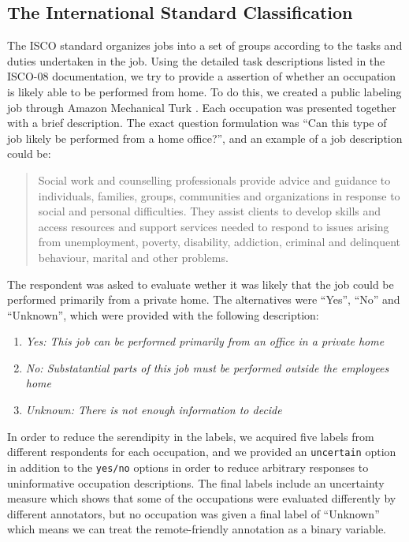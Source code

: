 \documentclass[11pt,]{article}
\begin{document}
\hypertarget{the-international-standard-classification}{%
\subsection{The International Standard
Classification}\label{the-international-standard-classification}}

The ISCO standard organizes jobs into a set of groups according to the
tasks and duties undertaken in the job. Using the detailed task
descriptions listed in the ISCO-08 documentation, we try to provide a
assertion of whether an occupation is likely able to be performed from
home. To do this, we created a public labeling job through Amazon
Mechanical Turk \citep{Turk2020}. Each occupation was presented together
with a brief description. The exact question formulation was ``Can this
type of job likely be performed from a home office?'', and an example of
a job description could be:

\begin{quote}
Social work and counselling professionals provide advice and guidance to
individuals, families, groups, communities and organizations in response
to social and personal difficulties. They assist clients to develop
skills and access resources and support services needed to respond to
issues arising from unemployment, poverty, disability, addiction,
criminal and delinquent behaviour, marital and other problems.
\end{quote}

The respondent was asked to evaluate wether it was likely that the job
could be performed primarily from a private home. The alternatives were
``Yes'', ``No'' and ``Unknown'', which were provided with the following
description:

\begin{enumerate}
\def\labelenumi{\arabic{enumi}.}
\item
  \emph{Yes: This job can be performed primarily from an office in a
  private home}
\item
  \emph{No: Substatantial parts of this job must be performed outside
  the employees home}
\item
  \emph{Unknown: There is not enough information to decide}
\end{enumerate}

In order to reduce the serendipity in the labels, we acquired five
labels from different respondents for each occupation, and we provided
an \texttt{uncertain} option in addition to the \texttt{yes/no} options
in order to reduce arbitrary responses to uninformative occupation
descriptions. The final labels include an uncertainty measure which
shows that some of the occupations were evaluated differently by
different annotators, but no occupation was given a final label of
``Unknown'' which means we can treat the remote-friendly annotation as a
binary variable.
\end{document}
